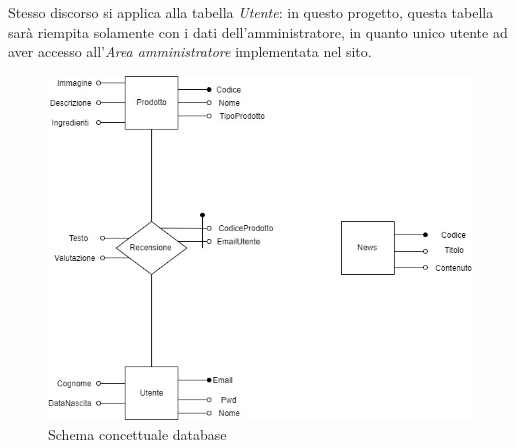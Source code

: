 Stesso discorso si applica alla tabella \emph{Utente}: in questo progetto, questa tabella sarà riempita solamente con i dati dell'amministratore, in quanto unico utente ad aver accesso all'\emph{Area amministratore} implementata nel sito.\\
\begin{figure}[!h]
	\centering
	\includegraphics[width=0.7\linewidth]{sezioni/Progettazione/Immagini/schema_concettuale.jpg}
    \caption{Schema concettuale database}
	\label{Fig:schemadb}
\end{figure}